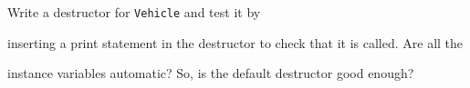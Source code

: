 Write a destructor for \texttt{Vehicle} and test it by

inserting a print statement in the destructor to check that it is called. Are all the

instance variables automatic? So, is the default destructor good enough?

